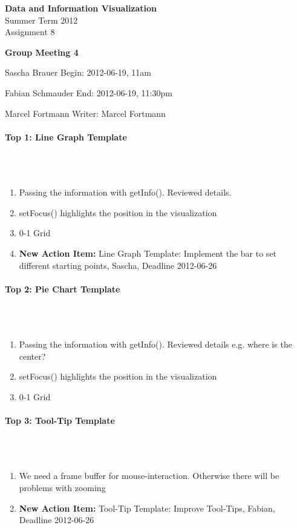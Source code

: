 \documentclass{scrartcl}
\begin{document}
\begin{center}
{\huge \textbf{Data and Information Visualization}}\\
Summer Term 2012\\
Assignment 8
\end{center}

\begin{center}
{\huge \textbf{Group Meeting 4}}\\
\end{center}
\begin{description}
\item Sascha Brauer \hfill Begin: 2012-06-19, 11am 
\item Fabian Schmauder \hfill End: 2012-06-19, 11:30pm
\item Marcel Fortmann \hfill Writer: Marcel Fortmann
\end{description}

\paragraph{Top 1: Line Graph Template}
\hfill \\ \hfill \\
\begin {enumerate}
\item Passing the information with getInfo(). Reviewed details.
\item setFocus() highlights the position in the visualization
\item 0-1 Grid
\item \textbf{New Action Item:} Line Graph Template: Implement the bar to set different starting points, Sascha, Deadline 2012-06-26
\end {enumerate}

\paragraph{Top 2: Pie Chart Template}
\hfill \\ \hfill \\
\begin {enumerate}
\item Passing the information with getInfo(). Reviewed details e.g. where is the center?
\item setFocus() highlights the position in the visualization
\item 0-1 Grid
\end {enumerate}

\paragraph{Top 3: Tool-Tip Template}
\hfill \\ \hfill \\
\begin {enumerate}
\item We need a frame buffer for mouse-interaction. Otherwise there will be problems with zooming
\item \textbf{New Action Item:} Tool-Tip Template:  Improve Tool-Tips, Fabian, Deadline 2012-06-26
\end {enumerate}
\end{document}
